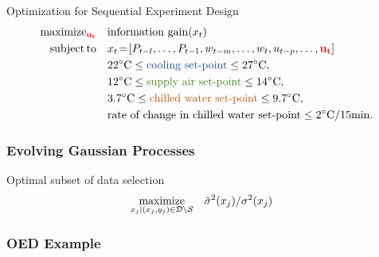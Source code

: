 \begin{frame}[t]
	
	\begin{block}{Optimization for Sequential Experiment Design}
		\setlength\abovedisplayskip{0pt}
		\begin{align*}
		\textstyle\maximize_{ \color{red} \mathbf{u_{t}}} & \ \ \ \text{information gain}(x_t) \\
		\subjectto &  \ \ \ x_{t}\!=\![P_{t-l}, \dots, P_{t-1}, w_{t-m}, \dots, w_{t}, u_{t-p}, \dots, \color{red} \mathbf{u_{t}} \color{black}] \\
		&  \ \ \ 22^\circ\mathrm{C} \leq \color[RGB]{29,73,153} \text{cooling set-point} \color{black} \leq  27^\circ\mathrm{C}, \\
		&  \ \ \ 12^\circ\mathrm{C} \leq \color[RGB]{74,133,34} \text{supply air set-point} \color{black} \leq  14^\circ\mathrm{C}, \\
		&  \ \ \ 3.7^\circ\mathrm{C} \leq \color[RGB]{190,81,8} \text{chilled water set-point} \color{black} \leq  9.7^\circ\mathrm{C}, \\
		&  \ \ \ \text{rate of change in chilled water set-point} \leq  2^\circ\mathrm{C/15min}.
		\end{align*}
	\end{block}
	
\end{frame}

\begin{frame}[t]
	
	\frametitle{Evolving Gaussian Processes}
	
	\begin{block}{Optimal subset of data selection}
		\setlength\abovedisplayskip{0pt}
		\begin{align*}
		\operatorname*{maximize}_{x_{j}|(x_j,y_j) \in \mathcal{D} \setminus \mathcal{S}} & \ \ \ \tilde{\sigma}^2(x_j)/{\sigma}^2(x_j) 
		\end{align*}
	\end{block}

\end{frame}

\begin{frame}[t]
	
	\frametitle{OED Example}
	
\begin{figure}[t]
	\centering
	\setlength{}
	\setlength{}
	
\end{figure}

\end{frame}

